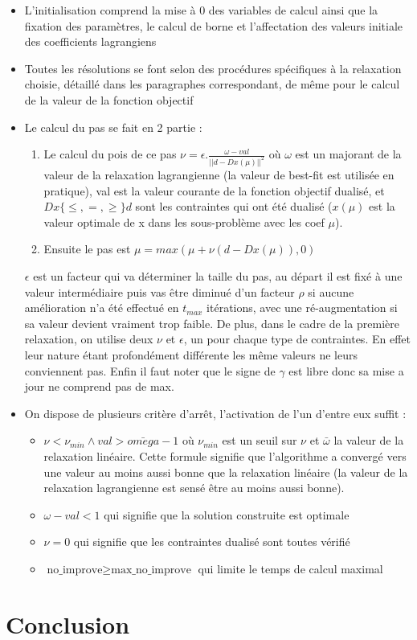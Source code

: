 \documentclass{article}
\begin{document}
\begin{itemize}
\item
L'initialisation comprend la mise à 0 des variables de calcul ainsi que la fixation des paramètres, le calcul de borne et l'affectation des valeurs initiale des coefficients lagrangiens
\item
Toutes les résolutions se font selon des procédures spécifiques à la relaxation choisie, détaillé dans les paragraphes correspondant, de même pour le calcul de la valeur de la fonction objectif
\item
Le calcul du pas se fait en 2 partie :
\begin{enumerate}[1 - ]
\item
Le calcul du pois de ce pas $\nu = \epsilon . \frac{\omega - val}{||d - Dx(\mu)||^2}$ où $\omega$ est un majorant de la valeur de la relaxation lagrangienne (la valeur de best-fit est utilisée en pratique), val est la valeur courante de la fonction objectif dualisé, et $Dx \{\leqslant, =, \geqslant\} d$ sont les contraintes qui ont été dualisé ($x(\mu)$ est la valeur optimale de x dans les sous-problème avec les coef $\mu$).
\item
Ensuite le pas est $\mu = max(\mu + \nu ( d - Dx(\mu)), 0)$
\end{enumerate}
$\epsilon$ est un facteur qui va déterminer la taille du pas, au départ il est fixé à une valeur intermédiaire puis vas être diminué d'un facteur $\rho$ si aucune amélioration n'a été effectué en $t_{max}$ itérations, avec une ré-augmentation si sa valeur devient vraiment trop faible. De plus, dans le cadre de la première relaxation, on utilise deux $\nu$ et $\epsilon$, un pour chaque type de contraintes. En effet leur nature étant profondément différente les même valeurs ne leurs conviennent pas. Enfin il faut noter que le signe de $\gamma$ est libre donc sa mise a jour ne comprend pas de max.
\item
On dispose de plusieurs critère d’arrêt, l'activation de l'un d'entre eux suffit :
\begin{itemize}
\item
$\nu < \nu_{min} \land val > \bar{omega} -1$ où $\nu_{min}$ est un seuil sur $\nu$ et $\bar{\omega}$ la valeur de la relaxation linéaire. Cette formule signifie que l'algorithme a convergé vers une valeur au moins aussi bonne que la relaxation linéaire (la valeur de la relaxation lagrangienne est sensé être au moins aussi bonne).
\item
$\omega - val < 1$ qui signifie que la solution construite est optimale
\item
$\nu = 0$ qui signifie que les contraintes dualisé sont toutes vérifié
\item
$\text{no\_improve} \geqslant \text{max\_no\_improve}$ qui limite le temps de calcul maximal
\end{itemize}
\end{itemize}

\section{Conclusion}
\end{document}

